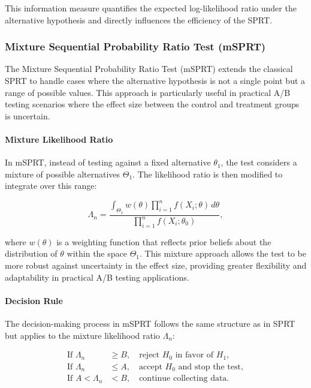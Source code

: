 \documentclass[magisterska, english]{pwr_wmat_praca_dyplomowa}
\theoremstyle{plain}
\numberwithin{theorem}{chapter}
\theoremstyle{definition}
\numberwithin{theorem}{chapter}
\begin{document}
This information measure quantifies the expected log-likelihood ratio under the alternative hypothesis and directly influences the efficiency of the SPRT.

\subsubsection{Mixture Sequential Probability Ratio Test (mSPRT)}

The Mixture Sequential Probability Ratio Test (mSPRT) extends the classical SPRT to handle cases where the alternative hypothesis is not a single point but a range of possible values. This approach is particularly useful in practical A/B testing scenarios where the effect size between the control and treatment groups is uncertain.

\paragraph{Mixture Likelihood Ratio}

In mSPRT, instead of testing against a fixed alternative \( \theta_1 \), the test considers a mixture of possible alternatives \( \Theta_1 \). The likelihood ratio is then modified to integrate over this range:

\[
\Lambda_n = \frac{\int_{\Theta_1} w(\theta) \prod_{i=1}^{n} f(X_i; \theta) \, d\theta}{\prod_{i=1}^{n} f(X_i; \theta_0)},
\]

where \( w(\theta) \) is a weighting function that reflects prior beliefs about the distribution of \( \theta \) within the space \( \Theta_1 \). This mixture approach allows the test to be more robust against uncertainty in the effect size, providing greater flexibility and adaptability in practical A/B testing applications.

\paragraph{Decision Rule}

The decision-making process in mSPRT follows the same structure as in SPRT but applies to the mixture likelihood ratio \( \Lambda_n \):

\begin{align*}
	\text{If } \Lambda_n &\geq B, \quad \text{reject } H_0 \text{ in favor of } H_1, \\
	\text{If } \Lambda_n &\leq A, \quad \text{accept } H_0 \text{ and stop the test}, \\
	\text{If } A < \Lambda_n &< B, \quad \text{continue collecting data}.
\end{align*}
\end{document}
